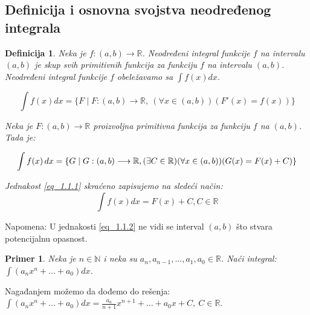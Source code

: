 \documentclass{article}
\newtheorem{definicija}{Definicija}[section]
\newtheorem{prim}{Primer}[section]
\begin{document}
\subsection{Definicija i osnovna svojstva neodređenog integrala}
\begin{definicijabox}
    \begin{definicija}
        Neka je $f: (a, b) \longrightarrow \mathbb{R}$.
        Neodređeni integral funkcije $f$ na intervalu $(a, b)$ je
        skup svih primitivnih funkcija za funkciju $f$ na intervalu
        $(a, b)$. Neodređeni integral funkcije $f$ obeležavamo sa
        $\int f(x)dx$.\par
        $$\int f(x) dx = \{F \mid F: (a, b) \longrightarrow \mathbb{R},\
            (\forall x\in(a,b))(F'(x) = f(x))\}$$\par
        Neka je $F: (a,b) \longrightarrow \mathbb{R}$ proizvoljna
        primitivna funkcija za funkciju $f$ na $(a,b)$. Tada je: \par

        \setcounter{equation}{0}

        \begin{equation} \label{eq_1.1.1}
            \int f(x) \, dx =\{G \mid G: (a, b)
            \longrightarrow \mathbb{R}, \\
            (\exists C \in \mathbb{R}) (\forall x \in (a, b))
            (G(x) = F(x) + C)\}
        \end{equation}

        Jednakost \eqref{eq_1.1.1} skraćeno zapisujemo na sledeći način:
        \begin{equation}\label{eq_1.1.2}
            \int f(x)dx = F(x) + C, C\in\mathbb{R}
        \end{equation}
    \end{definicija}
    Napomena: U jednakosti \eqref{eq_1.1.2} ne vidi se interval $(a, b)$ što
    stvara potencijalnu opasnost.
\end{definicijabox}

\begin{primbox}
    \begin{prim}
        Neka je $n \in \mathbb{N}$ i neka su $a_n, a_{n-1},
            ..., a_1, a_0 \in \mathbb{R}$. Naći integral:
        $\int (a_n  x^n + ... + a_0)dx$.
    \end{prim}
    Nagađanjem možemo da dođemo do rešenja:
    $\int (a_n  x^n + ... + a_0)dx=\frac{a_n}{n+1}x^{n+1} + ... +
        a_0x + C,\ C\in\mathbb{R}$.
\end{primbox}
\end{document}
